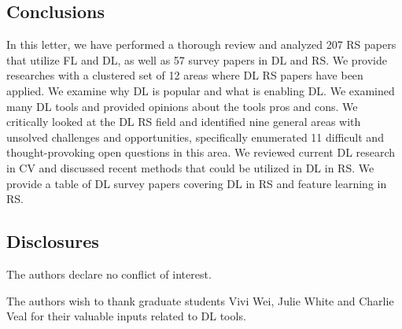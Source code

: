 \documentclass[12pt]{spieman}
\begin{document}
\begin{spacing}{1}
%
%
\section{Conclusions}
\label{sec:Conclusions}

In this letter, we have performed a thorough review and analyzed 207 RS papers that utilize FL and DL, as well as 57 survey papers in DL and RS. We provide researches with a clustered set of 12 areas where DL RS papers have been applied. We examine why DL is popular and what is enabling DL. We examined many DL tools and provided opinions about the tools pros and cons. We critically looked at the DL RS field and identified nine general areas with unsolved challenges and opportunities, specifically enumerated 11 difficult and thought-provoking open questions in this area. We reviewed current DL research in CV and discussed recent methods that could be utilized in DL in RS. We provide a table of DL survey papers covering DL in RS and feature learning in RS.

\subsection*{Disclosures}
The authors declare no conflict of interest.

%
%
\acknowledgments 
The authors wish to thank graduate students Vivi Wei, Julie White and Charlie Veal for their valuable inputs related to DL tools. 

%
%



\end{spacing}
\end{document}
